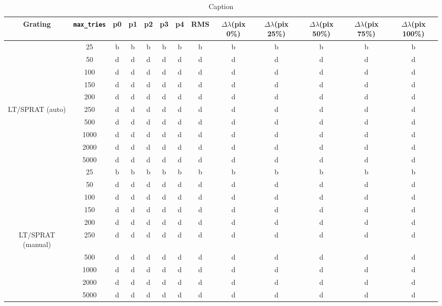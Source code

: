 \documentclass{aa}
\begin{document}
\begin{landscape}
    \begin{table}
        \centering
        \begin{tabular}{c|c|ccccc|c|ccccc}
   
            Grating & \texttt{max\_tries} & p0 & p1 & p2 & p3 & p4 & RMS & $\Delta\lambda$(pix 0\%) & $\Delta\lambda$(pix 25\%) & $\Delta\lambda$(pix 50\%) & $\Delta\lambda$(pix 75\%) & $\Delta\lambda$(pix 100\%)\\
            \hline
            \hline
              & 25 & b & b & b & b & b & b & b & b & b & b & b \\
              & 50 & d & d & d & d & d & d & d & d & d & d & d \\
              & 100 & d & d & d & d & d & d & d & d & d & d & d \\
              & 150 & d & d & d & d & d & d & d & d & d & d & d \\
              & 200 & d & d & d & d & d & d & d & d & d & d & d \\
            LT/SPRAT (auto) & 250 & d & d & d & d & d & d & d & d & d & d & d \\
              & 500 & d & d & d & d & d & d & d & d & d & d & d \\
              & 1000 & d & d & d & d & d & d & d & d & d & d & d \\
              & 2000 & d & d & d & d & d & d & d & d & d & d & d \\
              & 5000 & d & d & d & d & d & d & d & d & d & d & d \\\hline
              & 25 & b & b & b & b & b & b & b & b & b & b & b \\
              & 50 & d & d & d & d & d & d & d & d & d & d & d \\
              & 100 & d & d & d & d & d & d & d & d & d & d & d \\
              & 150 & d & d & d & d & d & d & d & d & d & d & d \\
              & 200 & d & d & d & d & d & d & d & d & d & d & d \\
            LT/SPRAT (manual) & 250 & d & d & d & d & d & d & d & d & d & d & d \\
              & 500 & d & d & d & d & d & d & d & d & d & d & d \\
              & 1000 & d & d & d & d & d & d & d & d & d & d & d \\
              & 2000 & d & d & d & d & d & d & d & d & d & d & d \\
              & 5000 & d & d & d & d & d & d & d & d & d & d & d \\\hline
        \end{tabular}
        \caption{Caption}
        \label{tab:stats}
    \end{table}
\end{landscape}
\end{document}
